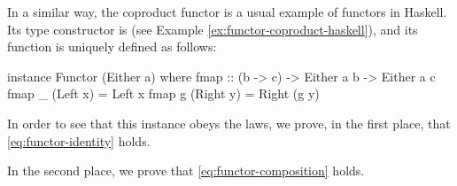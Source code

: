 \begin{example}
  \label{ex:functor-coproduct-haskell}


  In a similar way, the coproduct functor is a usual example of
  functors in Haskell. Its type constructor is 
  (see Example \ref{ex:functor-coproduct-haskell}), and its
   function is uniquely defined as follows:
  \begin{codehaskell}
instance Functor (Either a) where
  fmap :: (b -> c) -> Either a b -> Either a c
  fmap _ (Left x)  = Left x
  fmap g (Right y) = Right (g y)
  \end{codehaskell}
  In order to see that this instance obeys the laws, we prove, in the
  first place, that \eqref{eq:functor-identity} holds.

  \vspace{1em}
  \begin{steps}
  \end{steps}
  \begin{steps}
  \end{steps}
  In the second place, we prove that \eqref{eq:functor-composition}
  holds.

  \vspace{1em}
  \begin{steps}
  \end{steps}
  \begin{steps}
  \end{steps}

\end{example}

